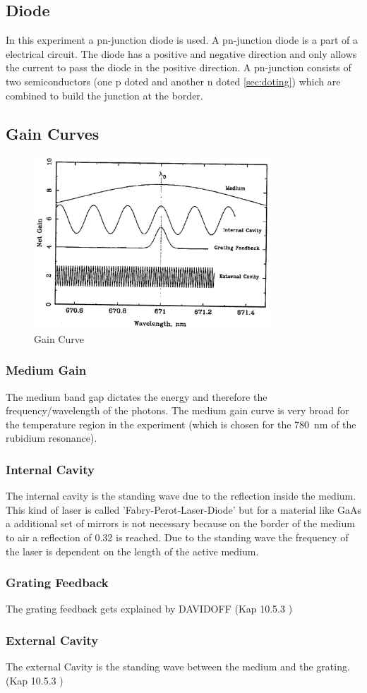 \subsection{Diode}
In this experiment a pn-junction diode is used.
A pn-junction diode is a part of a electrical circuit.
The diode has a positive and negative direction and only allows the current to pass the diode in the positive direction.
A pn-junction consists of two semiconductors (one p doted and another n doted \ref{sec:doting}) which are combined to build the junction at the border.
\cite{laser_diode}

\subsection{Gain Curves}
\begin{figure}
    \center
    \includegraphics[width=0.8\textwidth]{bilder/Gain_curve.png}
    \caption{Gain Curve \cite{anleitung}}
    \label{fig:gain}
\end{figure}
\subsubsection*{Medium Gain}
The medium band gap dictates the energy and therefore the frequency/wavelength of the photons.
The medium gain curve is very broad for the temperature region in the experiment (which is chosen for the \SI{780}{\nano \metre} of the rubidium resonance).
\subsubsection*{Internal Cavity}
The internal cavity is the standing wave due to the reflection inside the medium.
This kind of laser is called 'Fabry-Perot-Laser-Diode' but for a material like GaAs a additional set of mirrors is not necessary because on the border of the medium to air a reflection of \num{0.32} is reached.
Due to the standing wave the frequency of the laser is dependent on the length of the active medium. 
\subsubsection*{Grating Feedback}
The grating feedback gets explained by DAVIDOFF (Kap 10.5.3 \cite{eichler_laser})
\subsubsection*{External Cavity}
The external Cavity is the standing wave between the medium and the grating. (Kap 10.5.3 \cite{eichler_laser})